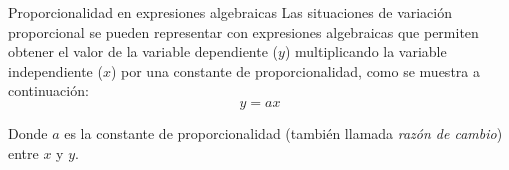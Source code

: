 \begin{infocard}{Proporcionalidad en expresiones algebraicas}
    Las situaciones de variación proporcional se pueden representar con expresiones
    algebraicas que permiten obtener el valor de la variable dependiente ($y$) multiplicando la
    variable independiente ($x$) por una constante de proporcionalidad, como se muestra a continuación:
    \[y=ax\]

    Donde $a$ es la constante de proporcionalidad (también llamada \emph{razón de cambio}) entre $x$ y $y$.
\end{infocard}